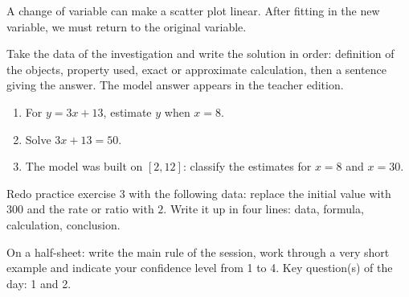 \begin{traceecrite}A change of variable can make a scatter plot linear. After fitting in the new variable, we must return to the original variable.\end{traceecrite}

\begin{exemple}
Take the data of the investigation and write the solution in order: definition of the objects, property used, exact or approximate calculation, then a sentence giving the answer. The model answer appears in the teacher edition.
\end{exemple}

\begin{exercice}[-- essential]
\begin{enumerate}\item For $y=3x+13$, estimate $y$ when $x=8$.\item Solve $3x+13=50$.\item The model was built on $[2,12]$: classify the estimates for $x=8$ and $x=30$.\end{enumerate}
\end{exercice}


\begin{dm}Redo practice exercise 3 with the following data: replace the initial value with $300$ and the rate or ratio with $2$. Write it up in four lines: data, formula, calculation, conclusion.\end{dm}

\begin{sortie}On a half-sheet: write the main rule of the session, work through a very short example and indicate your confidence level from 1 to 4. Key question(s) of the day: 1 and 2.\end{sortie}

